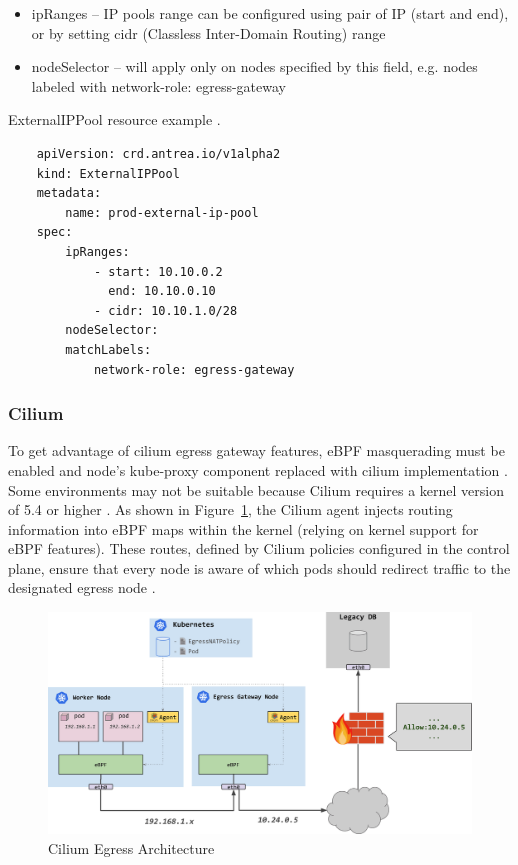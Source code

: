 \begin{itemize}
    \item ipRanges -- IP pools range can be configured using pair of IP (start and end), or by setting cidr (Classless Inter-Domain Routing) range
    \item nodeSelector -- will apply only on nodes specified by this field, e.g. nodes labeled with network-role: egress-gateway
\end{itemize}

\begin{listing}[htb]
    \centering
    \caption{ExternalIPPool resource example \cite{AntreaEgressArch}.}
    \begin{verbatim}
    apiVersion: crd.antrea.io/v1alpha2
    kind: ExternalIPPool
    metadata:
        name: prod-external-ip-pool
    spec:
        ipRanges:
            - start: 10.10.0.2
              end: 10.10.0.10
            - cidr: 10.10.1.0/28
        nodeSelector:
        matchLabels:
            network-role: egress-gateway
    \end{verbatim}
    \label{lst:yamlAntreaExternalIPPool}
\end{listing}
  


\subsubsection{Cilium}
\label{subsection:ciliumEgress}

To get advantage of cilium egress gateway features, eBPF masquerading must be enabled and node's kube-proxy component replaced with cilium implementation \cite{CiliumEgressGateway}. Some environments may not be suitable because Cilium requires a kernel version of 5.4 or higher \cite{CiliumInstall}. As shown in Figure~\ref{fig:ciliumEgressArch}, the Cilium agent injects routing information into eBPF maps within the kernel (relying on kernel support for eBPF features). These routes, defined by Cilium policies configured in the control plane, ensure that every node is aware of which pods should redirect traffic to the designated egress node \cite{CiliumEgressGateway}.

\begin{figure}[tbh]
    \centering
    \includegraphics[width=0.9\columnwidth]{images/cilium_egress.png}
    \caption{Cilium Egress Architecture \cite{CiliumEgressGatewayBlog}}
    \label{fig:ciliumEgressArch}
\end{figure}

